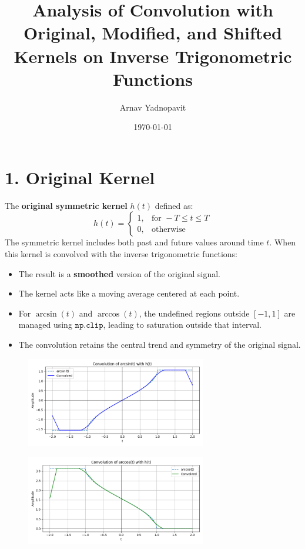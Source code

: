 \documentclass[12pt]{article}
\title{Analysis of Convolution with Original, Modified, and Shifted Kernels on Inverse Trigonometric Functions}
\author{Arnav Yadnopavit}
\date{\today}
\begin{document}
\maketitle


\section*{1. Original Kernel}
The \textbf{original symmetric kernel} $h(t)$ defined as:
    \[
    h(t) = 
    \begin{cases}
        1, & \text{for } -T \leq t \leq T \\
        0, & \text{otherwise}
    \end{cases}
    \]
The symmetric kernel includes both past and future values around time $t$. When this kernel is convolved with the inverse trigonometric functions:
\begin{itemize}
    \item The result is a \textbf{smoothed} version of the original signal.
    \item The kernel acts like a moving average centered at each point.
    \item For $\arcsin(t)$ and $\arccos(t)$, the undefined regions outside $[-1,1]$ are managed using $\texttt{np.clip}$, leading to saturation outside that interval.
    \item The convolution retains the central trend and symmetry of the original signal.
\end{itemize}
\begin{figure}[H]
    \centering
    \includegraphics[width=0.7\textwidth]{figs/org1.png}
\end{figure}
\begin{figure}[H]
    \centering
    \includegraphics[width=0.7\textwidth]{figs/org2.png}
\end{figure}
\end{document}
